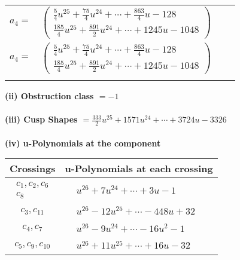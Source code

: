 \documentclass[1p]{elsarticle_modified}
\theoremstyle{definition}
\begin{document}
\begin{tabular}{m{7pt} m{180pt} m{7pt} m{180pt} }
\flushright $a_{4}=$&$\begin{pmatrix}\frac{5}{4} u^{25}+\frac{75}{4} u^{24}+\cdots+\frac{863}{4} u-128\\\frac{185}{4} u^{25}+\frac{891}{2} u^{24}+\cdots+1245 u-1048\end{pmatrix}$\\ \flushright $a_{4}=$&$\begin{pmatrix}\frac{5}{4} u^{25}+\frac{75}{4} u^{24}+\cdots+\frac{863}{4} u-128\\\frac{185}{4} u^{25}+\frac{891}{2} u^{24}+\cdots+1245 u-1048\end{pmatrix}$\\&\end{tabular}
\flushleft \textbf{(ii) Obstruction class $= -1$}\\~\\
\flushleft \textbf{(iii) Cusp Shapes $= \frac{333}{2} u^{25}+1571 u^{24}+\cdots+3724 u-3326$}\\~\\
\newpage\renewcommand{\arraystretch}{1}
\flushleft \textbf{(iv) u-Polynomials at the component}\newline \\
\begin{tabular}{m{50pt}|m{274pt}}
Crossings & \hspace{64pt}u-Polynomials at each crossing \\
\hline $$\begin{aligned}c_{1},c_{2},c_{6}\\c_{8}\end{aligned}$$&$\begin{aligned}
&u^{26}+7 u^{24}+\cdots+3 u-1
\end{aligned}$\\
\hline $$\begin{aligned}c_{3},c_{11}\end{aligned}$$&$\begin{aligned}
&u^{26}-12 u^{25}+\cdots-448 u+32
\end{aligned}$\\
\hline $$\begin{aligned}c_{4},c_{7}\end{aligned}$$&$\begin{aligned}
&u^{26}-9 u^{24}+\cdots-16 u^2-1
\end{aligned}$\\
\hline $$\begin{aligned}c_{5},c_{9},c_{10}\end{aligned}$$&$\begin{aligned}
&u^{26}+11 u^{25}+\cdots+16 u-32
\end{aligned}$\\
\hline
\end{tabular}\\~\\
\end{document}
